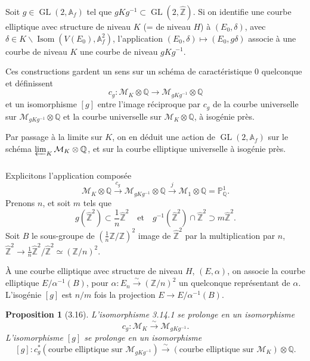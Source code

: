 \documentclass[11pt,a4paper]{amsart}
\theoremstyle{plain}
\newtheorem{proposition}[theorem]{Proposition}
\theoremstyle{definition}
\DeclareMathOperator{\Isom}{Isom}
\DeclareMathOperator{\Gl}{GL}
\newcommand{\mll}{\mathcal{M}}
\newcommand{\ZZ}{\mathbb{Z}}
\newcommand{\QQ}{\mathbb{Q}}
\newcommand{\PP}{\mathbb{P}}
\newcommand{\Af}{\mathbb{A}}
\begin{document}
\subsubsection{}
Soit $g \in \Gl(2, \Af_f)$ tel que $gKg^{-1} \subset \Gl(2, \hat{\ZZ})$. Si on identifie une courbe elliptique avec structure de niveau $K$ (= de niveau $H$) \`a $(E_0, \delta)$, avec $\delta \in K \backslash \Isom(V(E_0), \Af_f^2)$, l'application $(E_0, \delta) \mapsto (E_0, g\delta)$ associe \`a une courbe de niveau $K$ une courbe de niveau $gKg^{-1}$.

Ces constructions gardent un sens sur un sch\'ema de caract\'eristique $0$ quelconque et d\'efinissent
\begin{equation}\label{eq:3.14.1}
c_g \colon \mll_K \otimes \QQ \longrightarrow \mll_{gKg^{-1}} \otimes \QQ
\end{equation}
et un isomorphisme $[g]$ entre l'image r\'eciproque par $c_g$ de la courbe universelle sur $\mll_{gKg^{-1}} \otimes \QQ$ et la courbe universelle sur $\mll_K \otimes \QQ$, \`a isog\'enie pr\`es.

Par passage \`a la limite sur $K$, on en d\'eduit une action de $\Gl(2, \Af_f)$ sur le sch\'ema $\varprojlim_K \mll_K \otimes \QQ$, et sur la courbe elliptique universelle \`a isog\'enie pr\`es.

\subsubsection{}
Explicitons l'application compos\'ee
\[
\mll_K \otimes \QQ \xrightarrow{c_g} \mll_{gKg^{-1}} \otimes \QQ \xrightarrow{j} \mll_1 \otimes \QQ = \PP^1_{\QQ}.
\]
Prenons $n$, et soit $m$ tels que
\[
g(\hat{\ZZ}^2) \subset \frac{1}{n}\hat{\ZZ}^2 \quad \text{et} \quad g^{-1}(\hat{\ZZ}^2) \cap \hat{\ZZ}^2 \supset m\hat{\ZZ}^2.
\]
Soit $B$ le sous-groupe de $(\frac{1}{n}\ZZ/\ZZ)^2$ image de $\hat{\ZZ}^2$ par la multiplication par $n$, $\hat{\ZZ}^2 \to \frac{1}{n}\hat{\ZZ}^2/\hat{\ZZ}^2 \simeq (\ZZ/n)^2$.

\`A une courbe elliptique avec structure de niveau $H$, $(E, \alpha)$, on associe la courbe elliptique $E/\alpha^{-1}(B)$, pour $\alpha \colon E_n \xrightarrow{\sim} (\ZZ/n)^2$ un quelconque repr\'esentant de $\alpha$. L'isog\'enie $[g]$ est $n/m$ fois la projection $E \to E/\alpha^{-1}(B)$.

\begin{proposition}[3.16]
L'isomorphisme 3.14.1 se prolonge en un isomorphisme
\[
c_g \colon \mll_K \xrightarrow{\sim} \mll_{gKg^{-1}}.
\]
L'isomorphisme $[g]$ se prolonge en un isomorphisme
\[
[g] \colon c_g^*(\text{courbe elliptique sur } \mll_{gKg^{-1}}) \xrightarrow{\sim} (\text{courbe elliptique sur } \mll_K) \otimes \QQ.
\]
\end{proposition}
\end{document}
